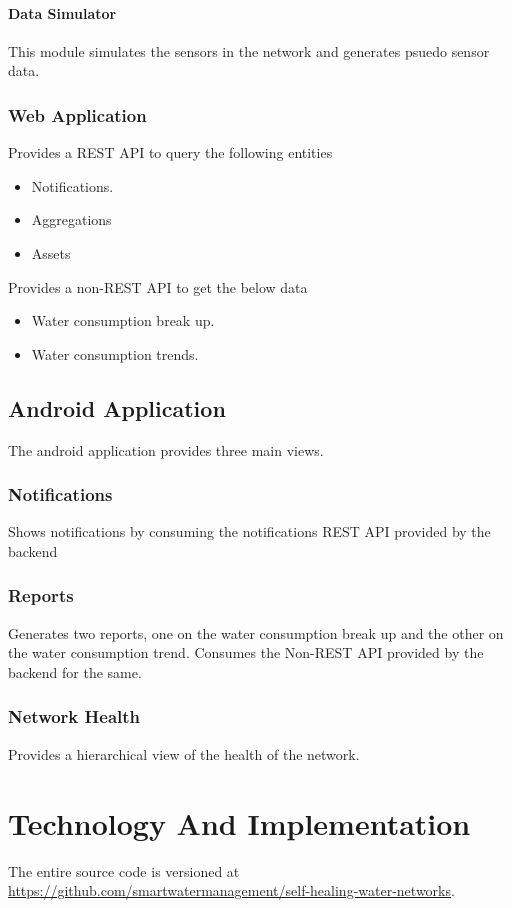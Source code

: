 \documentclass[11pt]{report} %
\begin{document}
\subsubsection{Data Simulator}
This module simulates the sensors in the network and generates psuedo sensor data.
\subsection{Web Application}
\label{sec:web_application_api}
Provides a REST API to query  the following entities
\begin{itemize}
\item Notifications.
\item Aggregations
\item Assets
\end{itemize}
Provides a non-REST API to get the below data
\begin{itemize}
\item Water consumption break up.
\item Water consumption trends.
\end{itemize}
\section{Android Application}
The android application provides three main views.
\subsection{Notifications}
Shows notifications by consuming the \textsf{notifications REST API} provided by the backend
\subsection{Reports}
Generates two reports, one on the water consumption break up and the other on the water consumption trend. Consumes the Non-REST API provided by the backend for the same.
\subsection{Network Health}
Provides a hierarchical view of the health of the network.


\chapter{Technology And Implementation}
The entire source code is versioned at \url {https://github.com/smartwatermanagement/self-healing-water-networks}.
\end{document}
